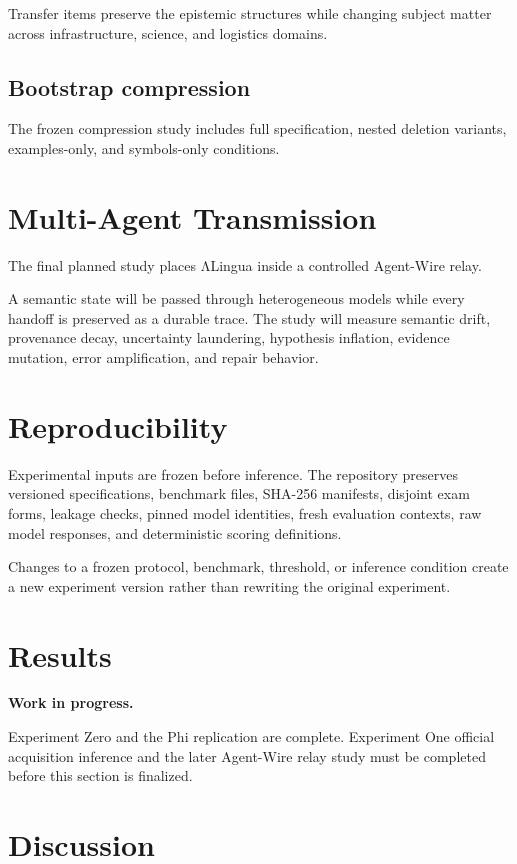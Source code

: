 \documentclass[11pt]{article}
\begin{document}
Transfer items preserve the epistemic structures while changing subject matter across infrastructure, science, and logistics domains.

\subsection{Bootstrap compression}

The frozen compression study includes full specification, nested deletion variants, examples-only, and symbols-only conditions.

\section{Multi-Agent Transmission}

The final planned study places ΛLingua inside a controlled Agent-Wire relay.

A semantic state will be passed through heterogeneous models while every handoff is preserved as a durable trace. The study will measure semantic drift, provenance decay, uncertainty laundering, hypothesis inflation, evidence mutation, error amplification, and repair behavior.

\section{Reproducibility}

Experimental inputs are frozen before inference. The repository preserves versioned specifications, benchmark files, SHA-256 manifests, disjoint exam forms, leakage checks, pinned model identities, fresh evaluation contexts, raw model responses, and deterministic scoring definitions.

Changes to a frozen protocol, benchmark, threshold, or inference condition create a new experiment version rather than rewriting the original experiment.

\section{Results}

\textbf{Work in progress.}

Experiment Zero and the Phi replication are complete. Experiment One official acquisition inference and the later Agent-Wire relay study must be completed before this section is finalized.

\section{Discussion}
\end{document}
